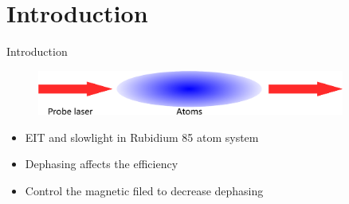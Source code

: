 \section{Introduction}

\begin{frame}{Introduction}
  \begin{figure}[!h]
    \centering
    \includegraphics[width=0.9\textwidth]{figure/Atoms.eps}
  \end{figure}

  \begin{itemize}
    \itmspace
    \item EIT and slowlight in Rubidium 85 atom system\itmspace
    \item Dephasing affects the efficiency\itmspace
    \item Control the magnetic filed to decrease dephasing
  \end{itemize}
\end{frame}